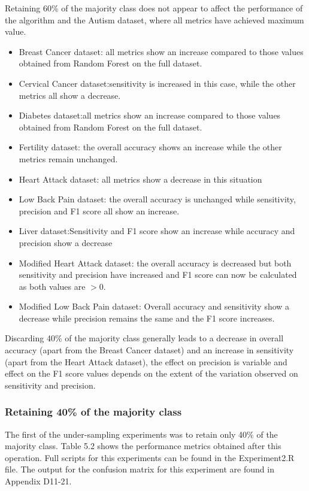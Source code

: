 Retaining 60\% of the majority class does not appear to affect the performance of the algorithm and the Autism dataset, where all metrics have achieved maximum value.
\begin{itemize}
    \item Breast Cancer dataset: all metrics show an increase compared to those values obtained from Random Forest on the full dataset.
    \item Cervical Cancer dataset:sensitivity is increased in this case, while the other metrics all show a decrease.
    \item Diabetes dataset:all metrics show an increase compared to those values obtained from Random Forest on the full dataset.
    \item Fertility dataset: the overall accuracy shows an increase while the other metrics remain unchanged.
    \item Heart Attack dataset: all metrics show a decrease in this situation
    \item Low Back Pain dataset: the overall accuracy is unchanged while sensitivity, precision and F1 score all show an increase.
    \item Liver dataset:Sensitivity and F1 score show an increase while accuracy and precision show a decrease
    \item Modified Heart Attack dataset: the overall accuracy is decreased but both sensitivity and precision have increased and F1 score can now be calculated as both values are $>$0.
    \item Modified Low Back Pain dataset: Overall accuracy and sensitivity show a decrease while precision remains the same and the F1 score increases.
\end{itemize}

Discarding 40\% of the majority class generally leads to a decrease in overall accuracy (apart from the Breast Cancer dataset) and an increase in sensitivity (apart from the Heart Attack dataset), the effect on precision is variable and effect on the F1 score values depends on the extent of the variation observed on sensitivity and precision.

\subsubsection{Retaining 40\% of the majority class}
The first of the under-sampling experiments was to retain only 40\% of the majority class. Table 5.2 shows the performance metrics obtained after this operation. Full scripts for this experiments can be found in the Experiment2.R file.
The output for the confusion matrix for this experiment are found in Appendix D11-21.

